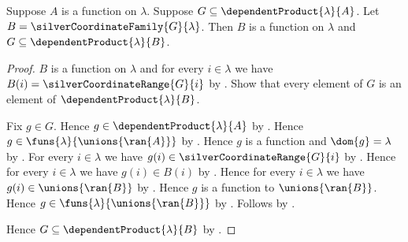 \begin{theorem}\label{silver_family_in_coordinate_product}
    Suppose $A$ is a function on $\lambda$.
    Suppose $G\subseteq\dependentProduct{\lambda}{A}$.
    Let $B=\silverCoordinateFamily{G}{\lambda}$.
    Then $B$ is a function on $\lambda$ and
        $G\subseteq\dependentProduct{\lambda}{B}$.
\end{theorem}
\begin{proof}
    $B$ is a function on $\lambda$ and
        for every $i\in\lambda$ we have
            $B(i)=\silverCoordinateRange{G}{i}$
        by .
    Show that every element of $G$ is an element of
        $\dependentProduct{\lambda}{B}$.
    \begin{subproof}
        Fix $g\in G$.
        Hence $g\in\dependentProduct{\lambda}{A}$ by .
        Hence $g\in\funs{\lambda}{\unions{\ran{A}}}$
            by .
        Hence $g$ is a function and $\dom{g}=\lambda$
            by .
        For every $i\in\lambda$ we have
            $g(i)\in\silverCoordinateRange{G}{i}$
            by .
        Hence for every $i\in\lambda$ we have $g(i)\in B(i)$
            by \auto.
        Hence for every $i\in\lambda$ we have
            $g(i)\in\unions{\ran{B}}$
            by .
        Hence $g$ is a function to $\unions{\ran{B}}$.
        Hence $g\in\funs{\lambda}{\unions{\ran{B}}}$
            by .
        Follows by .
    \end{subproof}
    Hence $G\subseteq\dependentProduct{\lambda}{B}$
        by .
\end{proof}

